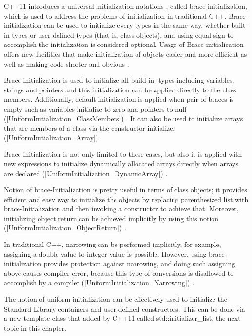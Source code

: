 \documentclass[11pt]{report}
\begin{document}
C++11 introduces a universal initialization notations { }, called brace-initialization, which is used to address the problems of initialization in traditional C++. Brace-initialization can be used to initialize every types in the same way, whether built-in types or user-defined types (that is, class objects), and using equal sign to accomplish the initialization is considered optional. Usage of Brace-initialization offers new facilities that make initialization of objects easier and more efficient as well as making code shorter and obvious \cite{Reddy:2011:API}.


Brace-initialization is used to initialize all build-in -types including variables, strings and pointers and this initialization can be applied directly to the class members. Additionally, default initialization is applied when pair of braces is empty such as variables initialize to zero and pointers to null (\ref{UniformInitialization_ClassMembers}) \cite{Reddy:2011:API}. It can also be used to initialize arrays that are members of a class via the constructor initializer (\ref{UniformInitialization_Array}).


Brace-initialization is not only limited to these cases, but also it is applied with new expressions to initialize dynamically allocated arrays directly when arrays are declared (\ref{UniformInitialization_DynamicArray}) \cite{Reddy:2011:API}.

Notion of brace-Initialization is pretty useful in terms of class objects; it provides efficient and easy way to initialize the objects by replacing parenthesized list with brace-Initialization and then invoking a constructor to achieve that. Moreover, initializing object return can be achieved implicitly by using this notion (\ref{UniformInitialization_ObjectReturn}) \cite{Gregorie:professionalcpp}.


In traditional C++, narrowing can be performed implicitly, for example, assigning a double value to integer value is possible. However, using brace- initialization provides protection against narrowing, and doing such assigning above causes compiler error, because this type of conversions is disallowed to accomplish by a compiler (\ref{UniformInitialization_Narrowing}) \cite{Gregorie:professionalcpp}.


The notion of uniform initialization can be effectively used to initialize the Standard Library containers and user-defined constructors. This can be done via a new template class that added by C++11 called std::initializer\_list, the next topic in this chapter.
\end{document}
